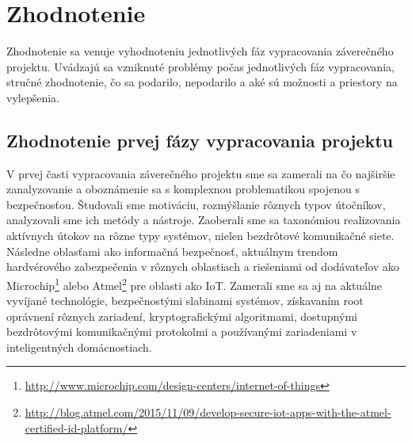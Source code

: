 \documentclass[12pt,a4wide,oneside,openright]{report}
\begin{document}
\chapter{Zhodnotenie} \label{s_conclusion}

Zhodnotenie sa venuje vyhodnoteniu jednotlivých fáz vypracovania záverečného projektu. Uvádzajú sa vzniknuté problémy počas jednotlivých fáz vypracovania, stručné zhodnotenie, čo sa podarilo, nepodarilo a aké sú možnosti a priestory na vylepšenia.

\section{Zhodnotenie prvej fázy vypracovania projektu}
V prvej časti vypracovania záverečného projektu sme sa zamerali na čo najširšie zanalyzovanie a oboznámenie sa s komplexnou problematikou spojenou s bezpečnosťou. Študovali sme motiváciu, rozmýšlanie rôznych typov útočníkov, analyzovali sme ich metódy a nástroje. Zaoberali sme sa taxonómiou realizovania aktívnych útokov na rôzne typy systémov, nielen bezdrôtové komunikačné siete. Následne oblasťami ako informačná bezpečnosť, aktuálnym trendom hardvérového zabezpečenia v rôznych oblastiach a riešeniami od dodávateľov ako Microchip\footnote{\url{http://www.microchip.com/design-centers/internet-of-things}} alebo Atmel\footnote{\url{http://blog.atmel.com/2015/11/09/develop-secure-iot-apps-with-the-atmel-certified-id-platform/}} pre oblasti ako IoT. Zamerali sme sa aj na aktuálne vyvíjané technológie, bezpečnostými slabinami systémov, získavaním root oprávnení rôznych zariadení, kryptografickými algoritmami, dostupnými bezdrôtovými komunikačnými protokolmi a používanými zariadeniami v inteligentných domácnostiach.

\end{document}
